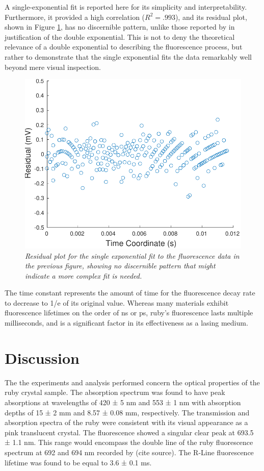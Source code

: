 \documentclass[11pt, a4paper, twocolumn]{article}
\begin{document}
A single-exponential fit is reported here for its simplicity and interpretability. Furthermore, it provided a high correlation ($R^2 = .993$), and its residual plot, shown in Figure \ref{fig:decayResiduals}, has no discernible pattern, unlike those reported by \cite{Jones} in justification of the double exponential. This is not to deny the theoretical relevance of a double exponential to describing the fluorescence process, but rather to demonstrate that the single exponential fits the data remarkably well beyond mere visual inspection.

\begin{figure}[]
\includegraphics[width=\linewidth]{decayResiduals.pdf}
\caption{\textit{Residual plot for the single exponential fit to the fluorescence data in the previous figure, showing no discernible pattern that might indicate a more complex fit is needed.}}
\label{fig:decayResiduals}
\end{figure}

The time constant represents the amount of time for the fluorescence decay rate to decrease to 1/e of its original value. Whereas many materials exhibit fluorescence lifetimes on the order of ns or ps, ruby’s fluorescence lasts multiple milliseconds, and is a significant factor in its effectiveness as a lasing medium.

\section*{Discussion}
The the experiments and analysis performed concern the optical properties of the ruby crystal sample. The absorption spectrum was found to have peak absorptions at wavelengths of 420 ± 5 nm and 553 ± 1 nm with absorption depths of 15 ± 2 mm and 8.57 ± 0.08 mm, respectively. The transmission and absorption spectra of the ruby were consistent with its visual appearance as a pink translucent crystal. The fluorescence showed a singular clear peak at 693.5 ± 1.1 nm. This range would encompass the double line of the ruby fluorescence spectrum at 692 and 694 nm recorded by (cite source). The R-Line fluorescence lifetime was found to be equal to 3.6 ± 0.1 ms.
\end{document}
